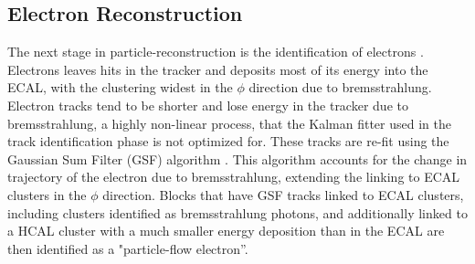 \subsection{Electron Reconstruction}
\label{electron_reco_overview}

\par The next stage in particle-reconstruction is the identification
of electrons \cite{CMS-PAS-PFT-09-001}.  Electrons leaves hits in the
tracker and deposits most of its energy into the ECAL, with the
clustering widest in the $\phi$ direction due to bremsstrahlung.
Electron tracks tend to be shorter and lose energy in the tracker due
to bremsstrahlung, a highly non-linear process, that the Kalman
fitter used in the track identification phase is not optimized for.
These tracks are re-fit using the Gaussian Sum Filter (GSF) algorithm
\cite{Adam:2005bya}. This algorithm accounts for the change in
trajectory of the electron due to bremsstrahlung, extending the
linking to ECAL clusters in the $\phi$ direction.  Blocks that have
GSF tracks linked to ECAL clusters, including clusters identified as
bremsstrahlung photons, and additionally linked to a HCAL cluster with
a much smaller energy deposition than in the ECAL are then identified
as a "particle-flow electron''.  

